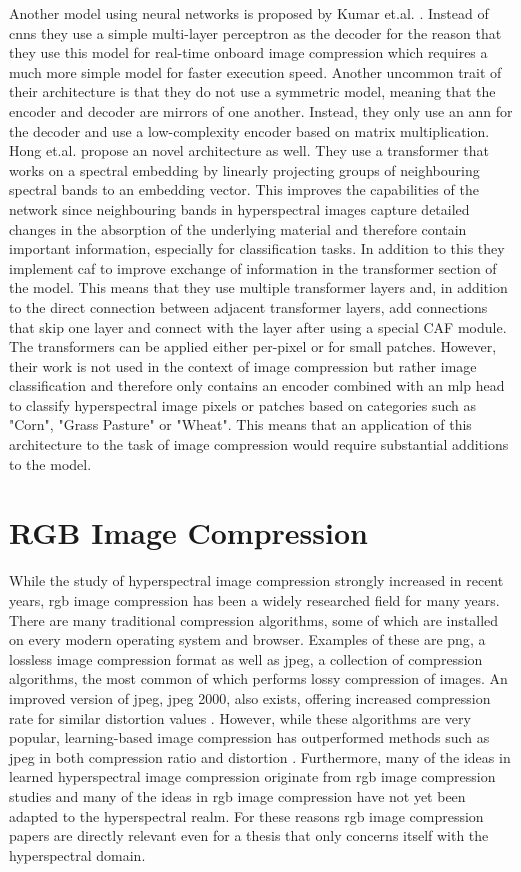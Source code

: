 Another model using neural networks is proposed by Kumar et.al. \citep{leal-taixe_onboard_2019}. Instead of \acp{cnn} they use a simple multi-layer perceptron as the decoder for the reason that they use this model for real-time onboard image compression which requires a much more simple model for faster execution speed. Another uncommon trait of their architecture is that they do not use a symmetric model, meaning that the encoder and decoder are mirrors of one another. Instead, they only use an \ac{ann} for the decoder and use a low-complexity encoder based on matrix multiplication.
Hong et.al. \citep{hong_spectralformer_2022} propose an novel architecture as well. They use a transformer that works on a spectral embedding by linearly projecting groups of neighbouring spectral bands to an embedding vector. This improves the capabilities of the network since neighbouring bands in hyperspectral images capture detailed changes in the absorption of the underlying material and therefore contain important information, especially for classification tasks.
In addition to this they implement \ac{caf} to improve exchange of information in the transformer section of the model. This means that they use multiple transformer layers and, in addition to the direct connection between adjacent transformer layers, add connections that skip one layer and connect with the layer after using a special CAF module.
The transformers can be applied either per-pixel or for small patches. However, their work is not used in the context of image compression but rather image classification and therefore only contains an encoder combined with an \ac{mlp} head to classify hyperspectral image pixels or patches based on categories such as "Corn", "Grass Pasture" or "Wheat". This means that an application of this architecture to the task of image compression would require substantial additions to the model. 
\section{RGB Image Compression \label{sec:ch2rgb}}
While the study of hyperspectral image compression strongly increased in recent years, \ac{rgb} image compression has been a widely researched field for many years. There are many traditional compression algorithms, some of which are installed on every modern operating system and browser. Examples of these are \ac{png}, a lossless image compression format as well as \ac{jpeg}, a collection of compression algorithms, the most common of which performs lossy compression of images. An improved version of \ac{jpeg}, \ac{jpeg} 2000, also exists, offering increased compression rate for similar distortion values \citep{fowler_three-dimensional_2007}.
However, while these algorithms are very popular, learning-based image compression has outperformed methods such as \ac{jpeg} in both compression ratio and distortion \citep{balle_end--end_2017}\citep{balle_variational_2018}. Furthermore, many of the ideas in learned hyperspectral image compression originate from \ac{rgb} image compression studies and many of the ideas in \ac{rgb} image compression have not yet been adapted to the hyperspectral realm. For these reasons \ac{rgb} image compression papers are directly relevant even for a thesis that only concerns itself with the hyperspectral domain.
